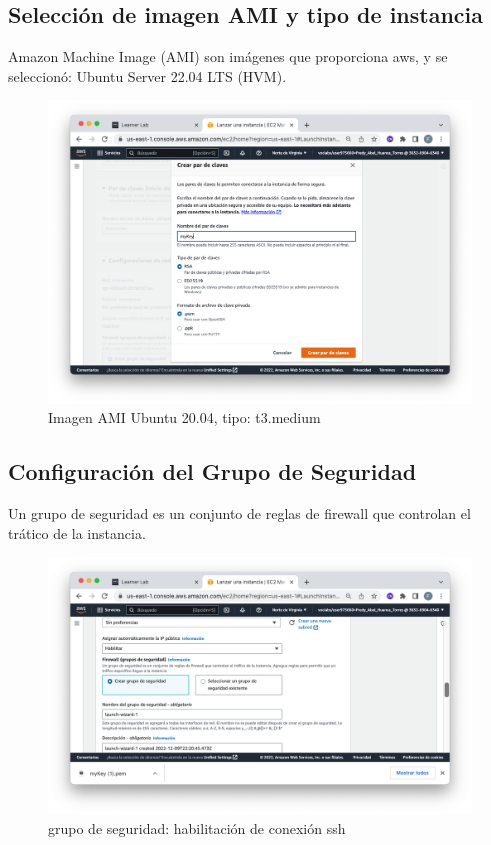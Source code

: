 \subsection{Selección de imagen AMI y tipo de instancia}

Amazon Machine Image (AMI) son imágenes que proporciona aws, y se seleccionó: Ubuntu Server 22.04 LTS (HVM).

\begin{figure}[h]
	\centering
	\includegraphics[scale=.3] {img/03}
	\caption{Imagen AMI Ubuntu 20.04, tipo: t3.medium}
	\label{fig:3}	
\end{figure}

\subsection{Configuración del Grupo de Seguridad}
Un grupo de seguridad es un conjunto de reglas de firewall  que controlan el trático de la instancia.
\begin{figure}[h]
	\centering
	\includegraphics[scale=.35] {img/04}
	\caption{grupo de seguridad: habilitación de conexión ssh}
	\label{fig:4}	
\end{figure}

